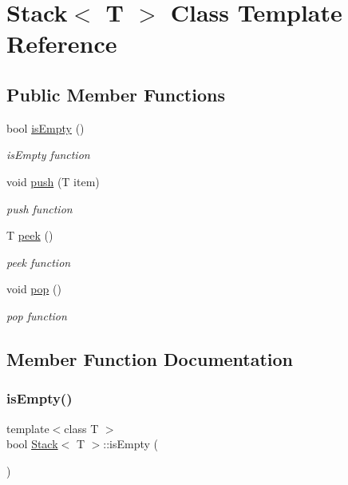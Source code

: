 \hypertarget{class_stack}{}\section{Stack$<$ T $>$ Class Template Reference}
\label{class_stack}
\subsection*{Public Member Functions}
\begin{DoxyCompactItemize}
\item 
bool \hyperlink{class_stack_ad0db0d9b249e871bb7504ed89a99d3a7}{is\+Empty} ()
\begin{DoxyCompactList}\small\item\em is\+Empty function \end{DoxyCompactList}\item 
void \hyperlink{class_stack_ac6a042db904e8f869ad8422658b6ca64}{push} (T item)
\begin{DoxyCompactList}\small\item\em push function \end{DoxyCompactList}\item 
T \hyperlink{class_stack_adcb4774ac8aa94cbc19b461da9bdee3a}{peek} ()
\begin{DoxyCompactList}\small\item\em peek function \end{DoxyCompactList}\item 
void \hyperlink{class_stack_a2723aec5c7e2611b97fcffeb7709de33}{pop} ()
\begin{DoxyCompactList}\small\item\em pop function \end{DoxyCompactList}\end{DoxyCompactItemize}


\subsection{Member Function Documentation}
\hypertarget{class_stack_ad0db0d9b249e871bb7504ed89a99d3a7}{}\label{class_stack_ad0db0d9b249e871bb7504ed89a99d3a7} 
\subsubsection{\texorpdfstring{is\+Empty()}{isEmpty()}}
{\footnotesize\ttfamily template$<$class T $>$ \\
bool \hyperlink{class_stack}{Stack}$<$ T $>$\+::is\+Empty (\begin{DoxyParamCaption}{ }\end{DoxyParamCaption})}



